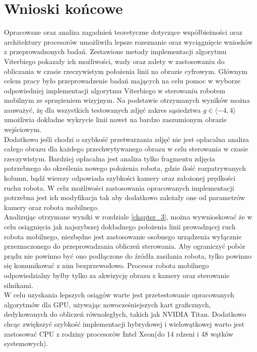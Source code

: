 \documentclass[document.tex]{subfiles}
\begin{document}
\chapter{Wnioski końcowe}
\indent Opracowane oraz analiza zagadnień teoretyczne dotyczące współbieżności oraz architektury procesorów
umożliwiła lepsze rozeznanie oraz wyciągnięcie wniosków z przeprowadzonych badań. Zestawione metody
implementacji algorytmu Viterbiego pokazały ich możliwości, wady oraz zalety w zastosowaniu 
do obliczania w czasie rzeczywistym położenia linii na obrazie cyfrowym. Głównym celem pracy 
było przeprowadzenie badań mających na celu pomoc w wyborze odpowiedniej implementacji
algorytmu Viterbiego w sterowaniu robotem mobilnym ze sprzężeniem wizyjnym.
Na podstawie otrzymanych wyników można zauważyć, żę dla wszystkich testowanych zdjęć zakres sąsiedztwa
$g\in \langle -4, 4 \rangle$ umożliwia dokładne wykrycie linii nawet na bardzo zaszumionym obrazie 
wejściowym.
\\
\indent Dodatkowo jeśli chodzi o szybkość przetwarzania zdjęć nie jest opłacalna analiza 
całego obrazu dla każdego przechwytywanego obrazu w celu sterowania w czasie rzeczywistym.
Bardziej opłacalna jest analiza tylko fragmentu zdjęcia potrzebnego do określenia nowego
położenia robota, gdzie ilość rozpatrywanych kolumn, bądź wierszy odpowiada szybkości 
kamery oraz założonej prędkości ruchu robota. W celu możliwości zastosowania
opracowanych implementacji potrzebna jest ich modyfikacja tak aby dodatkowo zależały
one od parametrów kamery oraz robota mobilnego.
\\
\indent Analizując otrzymane wyniki w rozdziale \ref{chapter_3}, można wywnioskować
że w celu osiągnięcia jak najszybszej dokładnego położenia linii prowadzącej ruch robota 
mobilnego, niezbędne jest zastosowanie osobnego urządzenia wyłącznie przeznaczonego
do przeprowadzania obliczeń sterowania. Aby ograniczyć pobór prądu nie powinno być ono
podłączone do źródła zasilania robota, tylko powinno się komunikować z nim bezprzewodowo.
Procesor robota mobilnego odpowiedzialny byłby tylko za akwizycję obrazu z kamery oraz
sterowanie silnikami.
\\
\indent W celu uzyskania lepszych osiągów warte jest przetestowanie opracowanych
algorytmów dla GPU, używając nowocześniejszych kart graficznych, dedykowanych do obliczeń równoległych,
takich jak NVIDIA Titan\cite{titan_spec}. Dodatkowo chcąc zwiększyć szybkość implementacji hybrydowej i wielowątkowej
warto jest zastosować CPU z rodziny procesorów Intel Xeon(do 14 rdzeni i 48 wątków systemowych\cite{xeon_spec}).
\end{document}

